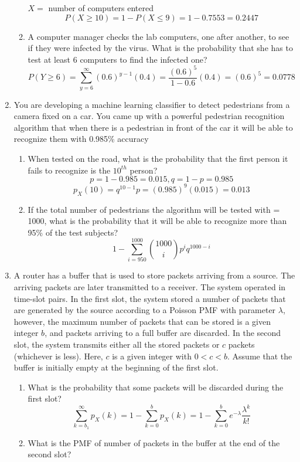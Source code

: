 \documentclass[10.5pt,letterpaper]{article}
\begin{document}
\begin{enumerate}[label=\textbf{Problem \arabic*.}]
\begin{enumerate}[label=\alph*)]
	$X=$ number of computers entered
	\[P(X\geq10)=1-P(X\leq9)=1-0.7553=0.2447\]
	\item A computer manager checks the lab computers, one after another, to see if they were infected by the virus. What is the probability that she has to test at least 6 computers to find the infected one?
	\[P(Y\geq6)=\sum_{y=6}^{\infty}(0.6)^{y-1}(0.4)=\frac{(0.6)^5}{1-0.6}(0.4)=(0.6)^5=0.0778\]
	\end{enumerate}
\item You are developing a machine learning classifier to detect pedestrians from a camera fixed on a car. You came up with a powerful pedestrian recognition algorithm that when there is a pedestrian in front of the car it will be able to recognize them with 0.985\% accuracy
	\begin{enumerate}[label=\alph*)]
	\item When tested on the road, what is the probability that the first person it fails to recognize is the $10^{th}$ person?
	\[p=1-0.985=0.015, q=1-p=0.985\]
	\[p_X(10)=q^{10-1}p=(0.985)^{9}(0.015)=0.013\]
	\item If the total number of pedestrians the algorithm will be tested with = 1000, what is the probability that it will be able to recognize more than 95\% of the test subjects?
	\[1-\sum_{i=950}^{1000}{{1000}\choose{i}}p^iq^{1000-i}\]
	\end{enumerate}
\item A router has a buffer that is used to store packets arriving from a source. The arriving packets are later transmitted to a receiver. The system operated in time-slot pairs. In the first slot, the system stored a number of packets that are generated by the source according to a Poisson PMF with parameter $\lambda$, however, the maximum number of packets that can be stored is a given integer $b$, and packets arriving to a full buffer are discarded. In the second slot, the system transmits either all the stored packets or $c$ packets (whichever is less). Here, $c$ is a given integer with $0<c<b$. Assume that the buffer is initially empty at the beginning of the first slot.
	\begin{enumerate}[label=\alph*)]
	\item What is the probability that some packets will be discarded during the first slot?\\
	\[\sum_{k=b_1}^{\infty}p_X(k)=1-\sum_{k=0}^{b}p_X(k)=1-\sum_{k=0}^{b}e^{-\lambda}\frac{\lambda^k}{k!}\]
	\item What is the PMF of number of packets in the buffer at the end of the second slot?

\end{enumerate}
\end{enumerate}
\end{document}
